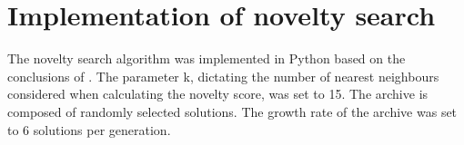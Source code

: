\section{Implementation of novelty search}
The novelty search algorithm was implemented in Python based on the conclusions of \cite{ns_study}.
The parameter k, dictating the number of nearest neighbours considered when calculating the novelty score,
was set to 15. The archive is composed of randomly selected solutions. The growth rate of the archive was set
to 6 solutions per generation.